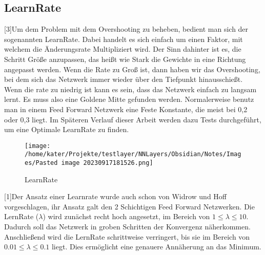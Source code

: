 \documentclass[12pt]{article}
\begin{document}
\subsection{ LearnRate}[3]Um dem Problem mit dem Overshooting zu beheben, bedient man sich der sogenannten LearnRate. Dabei handelt es sich einfach um einen Faktor, mit welchem die Änderungsrate Multipliziert wird. Der Sinn dahinter ist es, die Schritt Größe anzupassen, das heißt wie Stark die Gewichte in eine Richtung angepasst werden. Wenn die Rate zu Groß ist, dann haben wir das Overshooting, bei dem sich das Netzwerk immer wieder über den Tiefpunkt hinausschießt. Wenn die rate zu niedrig ist kann es sein, dass das Netzwerk einfach zu langsam lernt. Es muss also eine Goldene Mitte gefunden werden. Normalerweise benutz man in einem Feed Forward Netzwerk eine Feste Konstante, die meist bei 0,2 oder 0,3 liegt. Im Späteren Verlauf dieser Arbeit werden dazu Tests durchgeführt, um eine Optimale LearnRate zu finden.
\begin{figure}[H]
\centering
\texttt{[image: /home/kater/Projekte/testlayer/NNLayers/Obsidian/Notes/Images/Pasted image 20230917181526.png]}
\caption{LearnRate}
\label{Was kommt hier rein?}
\end{figure}
[1]Der Ansatz einer Learnrate wurde auch schon von Widrow und Hoff vorgeschlagen, ihr Ansatz galt den 2 Schichtigen Feed Forward Netzwerken. Die LernRate ($\lambda$) wird zunächst recht hoch angesetzt, im Bereich von $1 \le \lambda \le 10$. Dadurch soll das Netzwerk in groben Schritten der Konvergenz näherkommen. Anschließend wird die LernRate schrittweise verringert, bis sie im Bereich von $0.01 \le \lambda \le 0.1$ liegt. Dies ermöglicht eine genauere Annäherung an das Minimum.
\end{document}
